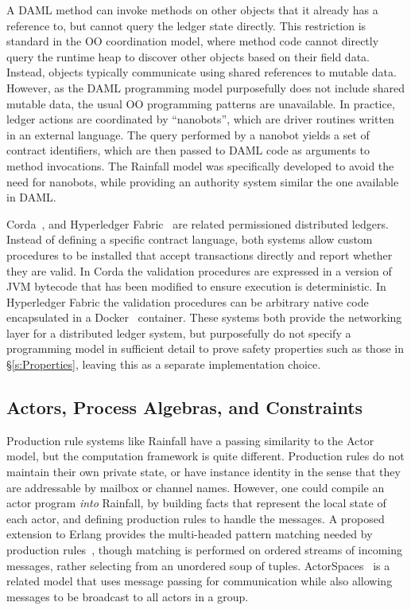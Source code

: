 A DAML method can invoke methods on other objects that it already has a reference to, but cannot query the ledger state directly. This restriction is standard in the OO coordination model, where method code cannot directly query the runtime heap to discover other objects based on their field data. Instead, objects typically communicate using shared references to mutable data. However, as the DAML programming model purposefully does not include shared mutable data, the usual OO programming patterns are unavailable. In practice, ledger actions are coordinated by ``nanobots'', which are driver routines written in an external language. The query performed by a nanobot yields a set of contract identifiers, which are then passed to DAML code as arguments to method invocations. The Rainfall model was specifically developed to avoid the need for nanobots, while providing an authority system similar the one available in DAML.

Corda~\cite{Hearn2016:Corda}, and Hyperledger Fabric~\cite{Androulaki2018:Fabric} are related permissioned distributed ledgers. Instead of defining a specific contract language, both systems allow custom procedures to be installed that accept transactions directly and report whether they are valid. In Corda the validation procedures are expressed in a version of JVM bytecode that has been modified to ensure execution is deterministic. In Hyperledger Fabric the validation procedures can be arbitrary native code encapsulated in a Docker~\cite{Docker2019} container. These systems both provide the networking layer for a distributed ledger system, but purposefully do not specify a programming model in sufficient detail to prove safety properties such as those in \S\ref{s:Properties}, leaving this as a separate implementation choice.


\subsection{Actors, Process Algebras, and Constraints}
Production rule systems like Rainfall have a passing similarity to the Actor~\cite{Agha92:ActorTheory} model, but the computation framework is quite different. Production rules do not maintain their own private state, or have instance identity in the sense that they are addressable by mailbox or channel names. However, one could compile an actor program \emph{into} Rainfall, by building facts that represent the local state of each actor, and defining production rules to handle the messages. A proposed extension to Erlang provides the multi-headed pattern matching needed by production rules~\cite{Sulzmann2008:MultiHeaded}, though matching is performed on ordered streams of incoming messages, rather selecting from an unordered soup of tuples. ActorSpaces~\cite{Agha1993:ActorSpace} is a related model that uses message passing for communication while also allowing messages to be broadcast to all actors in a group.

